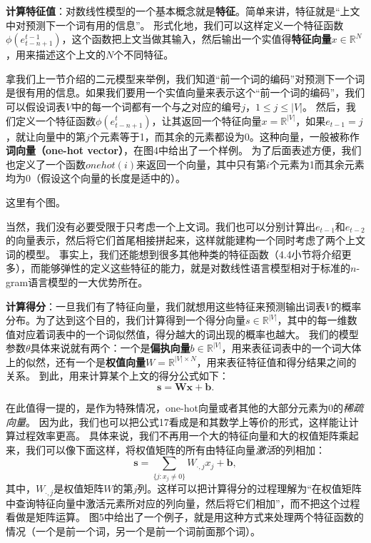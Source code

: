 \documentclass[10pt,a4paper]{ctexart}
\begin{document}
\textbf{计算特征值}：对数线性模型的一个基本概念就是\textbf{特征}。简单来讲，特征就是“上文中对预测下一个词有用的信息”。
形式化地，我们可以这样定义一个特征函数$\phi (e_{t-n+1}^{t-1})$，这个函数把上文当做其输入，然后输出一个实值得\textbf{特征向量$x$}$\in \mathbb{R}^N$，用来描述这个上文的$N$个不同特征。

拿我们上一节介绍的二元模型来举例，我们知道“前一个词的编码”对预测下一个词是很有用的信息。如果我们要用一个实值向量来表示这个“前一个词的编码”，我们可以假设词表$V$中的每一个词都有一个与之对应的编号$j$，$1 \leq j \leq |V|$。
然后，我们定义一个特征函数$\phi (e_{t-n+1}^t)$，让其返回一个特征向量$x = \mathbb{R}^{|V|}$，如果$e_{t-1}=j$，就让向量中的第$j$个元素等于1，而其余的元素都设为0。这种向量，一般被称作\textbf{词向量（one-hot vector）}，在图4中给出了一个样例。
为了后面表述方便，我们也定义了一个函数$onehot(i)$来返回一个向量，其中只有第$i$个元素为1而其余元素均为0（假设这个向量的长度是适中的）。

这里有个图。

当然，我们没有必要受限于只考虑一个上文词。我们也可以分别计算出$e_{t-1}$和$e_{t-2}$的向量表示，然后将它们首尾相接拼起来，这样就能建构一个同时考虑了两个上文词的模型。
事实上，我们还能想到很多其他种类的特征函数（4.4小节将介绍更多），而能够弹性的定义这些特征的能力，就是对数线性语言模型相对于标准的$n$-gram语言模型的一大优势所在。

\textbf{计算得分}：一旦我们有了特征向量，我们就想用这些特征来预测输出词表$V$的概率分布。为了达到这个目的，我们计算得到一个得分向量$s \in \mathbb{R}^{|V|}$，其中的每一维数值对应着词表中的一个词似然值，得分越大的词出现的概率也越大。
我们的模型参数$\theta$具体来说就有两个：一个是\textbf{偏执向量}$b \in \mathbb{R}^{|V|}$，用来表征词表中的一个词大体上的似然，还有一个是\textbf{权值向量}$W = \mathbb{R}^{|V| \times N}$，用来表征特征值和得分结果之间的关系。
到此，用来计算某个上文的得分公式如下：
\[
 \textbf{s} = \textbf{Wx} + \textbf{b}.
\]

在此值得一提的，是作为特殊情况，one-hot向量或者其他的大部分元素为0的\textit{稀疏向量}。
因为此，我们也可以把公式17看成是和其数学上等价的形式，这样能让计算过程效率更高。
具体来说，我们不再用一个大的特征向量和大的权值矩阵乘起来，我们可以像下面这样，将权值矩阵的所有由特征向量\textit{激活}的列相加：
\[
 \textbf{s} = \sum_{\{j:x_j \neq 0\}} W_{\cdot,j}x_{j} + \textbf{b},
\]
其中，$W_{\cdot,j}$是权值矩阵$W$的第$j$列。这样可以把计算得分的过程理解为“在权值矩阵中查询特征向量中激活元素所对应的列向量，然后将它们相加”，而不把这个过程看做是矩阵运算。
图5中给出了一个例子，就是用这种方式来处理两个特征函数的情况（一个是前一个词，另一个是前一个词前面那个词）。
\end{document}
